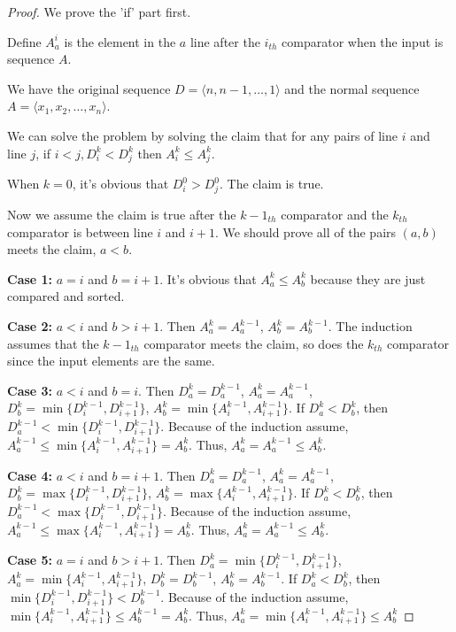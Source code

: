 \documentclass[12pt,a4paper]{article}
\theoremstyle{definition}
\begin{document}
\begin{enumerate}
\begin{proof}
\par
We prove the 'if' part first.

Define $A_a^i$ is the element in the $a$ line after the $i_{th}$ comparator when the input is sequence $A$.

We have the original sequence $D=\langle n,n-1,\dots,1\rangle$ and the normal sequence $A=\langle x_1,x_2,\dots,x_n\rangle$.

We can solve the problem by solving the claim that for any pairs of line $i$ and line $j$, if $i<j,D_i^k<D_j^k$ then $A_i^k\leq A_j^k$.

When $k=0$, it's obvious that $D_i^0>D_j^0$. The claim is true.

Now we assume the claim is true after the $k-1_{th}$ comparator and the $k_{th}$ comparator is between line $i$ and $i+1$. We should prove all of the pairs $(a,b)$ meets the claim, $a<b$.

\textbf{Case 1:} $a=i$ and $b=i+1$. It's obvious that $A_a^k\leq A_b^k$ because they are just compared and sorted.

\textbf{Case 2:} $a<i$ and $b>i+1$. Then $A_a^k=A_a^{k-1}$, $A_b^k=A_b^{k-1}$. The induction assumes that the $k-1_{th}$ comparator meets the claim, so does the $k_{th}$ comparator since the input elements are the same.

\textbf{Case 3:} $a<i$ and $b=i$. Then $D_a^k=D_a^{k-1}$, $A_a^k=A_a^{k-1}$, $D_b^k=\min\{D_i^{k-1},D_{i+1}^{k-1}\}$, $A_b^k=\min\{A_i^{k-1}, A_{i+1}^{k-1}\}$. If $D_a^k<D_b^k$, then $D_a^{k-1}<\min\{D_i^{k-1},D_{i+1}^{k-1}\}$. Because of the induction assume, $A_a^{k-1}\leq\min\{A_i^{k-1},A_{i+1}^{k-1}\}=A_b^k$. Thus, $A_a^k=A_a^{k-1}\leq A_b^k$.

\textbf{Case 4:} $a<i$ and $b=i+1$. Then $D_a^k=D_a^{k-1}$, $A_a^k=A_a^{k-1}$, $D_b^k=\max\{D_i^{k-1},D_{i+1}^{k-1}\}$, $A_b^k=\max\{A_i^{k-1}, A_{i+1}^{k-1}\}$. If $D_a^k<D_b^k$, then $D_a^{k-1}<\max\{D_i^{k-1},D_{i+1}^{k-1}\}$. Because of the induction assume, $A_a^{k-1}\leq\max\{A_i^{k-1},A_{i+1}^{k-1}\}=A_b^k$. Thus, $A_a^k=A_a^{k-1}\leq A_b^k$.

\textbf{Case 5:} $a=i$ and $b>i+1$. Then $D_a^k=\min\{D_i^{k-1},D_{i+1}^{k-1}\}$, $A_a^k=\min\{A_{i}^{k-1},A_{i+1}^{k-1}\}$, $D_b^k=D_b^{k-1}$, $A_b^k=A_b^{k-1}$. If $D_a^k<D_b^k$, then $\min\{D_i^{k-1},D_{i+1}^{k-1}\}<D_b^{k-1}$. Because of the induction assume, $\min\{A_i^{k-1},A_{i+1}^{k-1}\}\leq A_b^{k-1}=A_b^k$. Thus, $A_a^k=\min\{A_i^{k-1},A_{i+1}^{k-1}\}\leq A_b^k$


\end{proof}
\end{enumerate}
\end{document}
